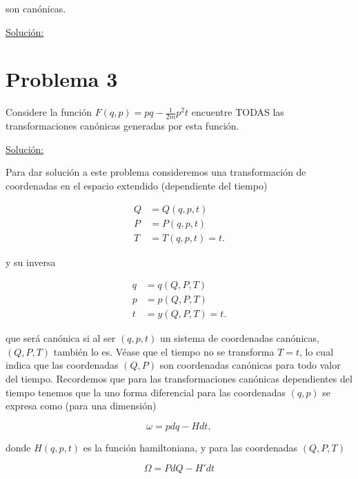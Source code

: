 \documentclass[a4paper,10pt]{article}
\numberwithin{equation}{section}
\begin{document}
son canónicas.

\vspace{.3cm}

\underline{Solución:} \vspace{.3cm}

\section{Problema 3}

Considere la función $F(q,p) = pq - \frac{1}{2m}p^2 t$ encuentre TODAS las transformaciones 
canónicas generadas por esta función.

\vspace{.3cm}

\underline{Solución:} \vspace{.3cm}

Para dar solución a este problema consideremos una transformación de 
coordenadas en el espacio extendido (dependiente del tiempo) 

\begin{align*}
 Q &= Q(q,p,t) \\
 P &= P(q,p,t) \\
 T &= T(q,p,t) = t.
\end{align*}

y su inversa 

\begin{align*}
 q &= q(Q,P,T) \\
 p &= p(Q,P,T) \\
 t &= y(Q,P,T) = t.
\end{align*}

que será canónica si al ser $(q,p,t)$ un sistema de coordenadas canónicas, $(Q,P,T)$ 
también lo es. Véase que el tiempo no se transforma $T = t$, lo cual indica que 
las coordenadas $(Q,P)$ son coordenadas canónicas para todo valor del tiempo. Recordemos 
que para las transformaciones canónicas dependientes del tiempo tenemos que la 
uno forma diferencial para las coordenadas $(q,p)$ se expresa como (para una dimensión)

\begin{equation}
 \omega = pdq - Hdt,
\end{equation}

donde $H(q,p,t)$ es la función hamiltoniana, y para las coordenadas $(Q,P,T)$ 

\begin{equation}
 \Omega = PdQ - H'dt
\end{equation}
\end{document}
